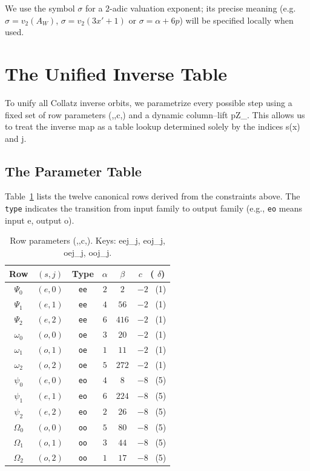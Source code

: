 \documentclass[11pt,letterpaper]{amsart}
\def\mathrm#1{#1}%
\def\mathbb#1{#1}%
\def\({}%
\def\){}%
\theoremstyle{definition}
\theoremstyle{plain}
\theoremstyle{plain}
\theoremstyle{remark}
\begin{document}
We use the symbol $\sigma$ for a $2$-adic valuation exponent; its precise meaning (e.g. $\sigma=v_2(A_W)$, $\sigma=v_2(3x'+1)$ or $\sigma = \alpha + 6p$) will be specified locally when used.


\section{The Unified Inverse Table}
\label{sec:unified-table}

To unify all Collatz inverse orbits, we parametrize every possible step using a fixed set of row parameters \((\alpha,\beta,c,\delta)\) and a dynamic column--lift \(p\in\mathbb{Z}_{}\). This allows us to treat the inverse map as a table lookup determined solely by the indices \(s(x)\) and \(j\).

\subsection{The Parameter Table}
Table~\ref{tab:parameters-abc} lists the twelve canonical rows derived from the constraints above. The \texttt{type} indicates the transition from input family to output family (e.g., \texttt{eo} means input \(\mathrm{e}\), output \(\mathrm{o}\)).

\begin{table}[!htbp]
\centering
\caption{Row parameters \((\alpha,\beta,c,\delta)\). Keys: \(\mathrm{ee}j\leftrightarrow \Psi_j\), \(\mathrm{eo}j\leftrightarrow \psi_j\), \(\mathrm{oe}j\leftrightarrow \omega_j\), \(\mathrm{oo}j\leftrightarrow \Omega_j\).}
\label{tab:parameters-abc}
\begin{tabular}{@{}c c c c c c@{}}
\toprule
Row & $(s,j)$ & Type & $\alpha$ & $\beta$ & $c$ \ ( $\delta$)\\\midrule
$\Psi_0$ & $(\mathrm e,0)$ & \texttt{ee} & $2$ & $2$   & $-2$ \ (1)\\
$\Psi_1$ & $(\mathrm e,1)$ & \texttt{ee} & $4$ & $56$  & $-2$ \ (1)\\
$\Psi_2$ & $(\mathrm e,2)$ & \texttt{ee} & $6$ & $416$ & $-2$ \ (1)\\
$\omega_0$ & $(\mathrm o,0)$ & \texttt{oe} & $3$ & $20$  & $-2$ \ (1)\\
$\omega_1$ & $(\mathrm o,1)$ & \texttt{oe} & $1$ & $11$  & $-2$ \ (1)\\
$\omega_2$ & $(\mathrm o,2)$ & \texttt{oe} & $5$ & $272$ & $-2$ \ (1)\\
\midrule
$\psi_0$ & $(\mathrm e,0)$ & \texttt{eo} & $4$ & $8$   & $-8$ \ (5)\\
$\psi_1$ & $(\mathrm e,1)$ & \texttt{eo} & $6$ & $224$ & $-8$ \ (5)\\
$\psi_2$ & $(\mathrm e,2)$ & \texttt{eo} & $2$ & $26$  & $-8$ \ (5)\\
$\Omega_0$ & $(\mathrm o,0)$ & \texttt{oo} & $5$ & $80$  & $-8$ \ (5)\\
$\Omega_1$ & $(\mathrm o,1)$ & \texttt{oo} & $3$ & $44$  & $-8$ \ (5)\\
$\Omega_2$ & $(\mathrm o,2)$ & \texttt{oo} & $1$ & $17$  & $-8$ \ (5)\\
\bottomrule
\end{tabular}
\end{table}
\end{document}

